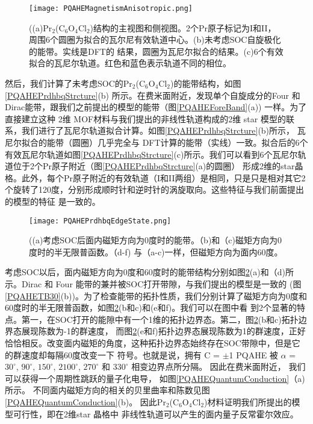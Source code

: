 \begin{figure}[htb]
  \centering
  \texttt{[image: PQAHEMagnetismAnisotropic.png]}
  \caption{((a)Pr$_2$(C$_6$O$_4$Cl$_2$)结构的主视图和侧视图。2个Pr原子标记为I和II，周围6个圆圈为拟合的瓦尔尼有效轨道中心。(b)未考虑SOC自旋极化的能带。实线是DFT的
  结果，圆圈为瓦尼尔拟合的结果。(c)6个有效拟合的瓦尼尔轨道。红色和蓝色表示轨道不同的相位。}
  \label{PQAHEMagnetismAnisotropic}
  \note{}
\end{figure}

然后，我们计算了未考虑SOC的Pr$_2$(C$_6$O$_4$Cl$_2$)的能带结构，如图
\ref{PQAHEPrdhbqStrcture}(b) 所示。在费米面附近，发现单个自旋成分的Four 和 Dirac能带，跟我们之前提出的模型的能带（图\ref{PQAHEForeBand}(a)) 一样。为了直接建立这种
2维 MOF材料与我们提出的非线性轨道构成的2维 star 模型的联系，我们进行了瓦尼尔轨道拟合计算。如图\ref{PQAHEPrdhbqStrcture}(b)所示， 瓦尼尔拟合的能带（圆圈）几乎完全与
DFT计算的能带（实线）一致。拟合后的6个有效瓦尼尔轨道如图\ref{PQAHEPrdhbqStrcture}(c)所示。我们可以看到6个瓦尼尔轨道位于2个Pr原子附近（图\ref{PQAHEPrdhbqStrcture}(a)的圆圈）
形成2维的star晶格。此外，每个Pr原子附近的有效轨道（I和II两组）是相同，只是只是相对其它2个旋转了120度，分别形成顺时针和逆时针的涡旋取向。这些特征与我们前面提出的模型的特征
是一致的。

\begin{figure}[htb]
  \centering
  \texttt{[image: PQAHEPrdhbqEdgeState.png]}
  \caption{((a)考虑SOC后面内磁矩方向为0度时的能带。（b)和（c)磁矩方向为0度时的半无限普函数。（d-f) 与（a-c)一样，但磁矩方向为面内60度。}
  \label{PQAHEPrdhbqEdgeState}
  \note{}
\end{figure}

考虑SOC以后，面内磁矩方向为0度和60度时的能带结构分别如图\ref{PQAHEPrdhbqEdgeState}(a)和（d)所示。Dirac 和 Four 能带的兼并被SOC打开带隙，与我们提出的模型是一致的
(图\ref{PQAHETB30}(b))。为了检查能带的拓扑性质，我们分别计算了磁矩方向为0度和60度时的半无限普函数，如图\ref{PQAHEPrdhbqEdgeState}(b和c)和(e和f)。我们可以在图中看
到2个显著的特点。第一，在SOC打开的能隙中有一个1维的拓扑边界态。第二，图\ref{PQAHEPrdhbqEdgeState}(b和c)拓扑边界态展现陈数为-1的群速度，
而图\ref{PQAHEPrdhbqEdgeState}(e和f)拓扑边界态展现陈数为1的群速度，正好恰恰相反。改变面内磁矩的角度，这种拓扑边界态始终存在SOC带隙中，但是它的群速度却每隔60度改变一下
符号。也就是说，拥有 C = $\pm$1 PQAHE 被 $\alpha$ = $30 ^\circ$, $90 ^\circ$, $150 ^\circ$, $2100 ^\circ$, $270 ^\circ$ 和 $330 ^\circ$ 相变边界点所分隔。
因此在费米面附近， 我们可以获得一个周期性跳跃的量子化电导， 如图\ref{PQAHEQuantumConduction}（a)所示。
不同面内磁矩方向的相关的贝里曲率和陈数见图\ref{PQAHEQuantumConduction}(b)。 因此Pr$_2$(C$_6$O$_4$Cl$_2$)材料证明我们所提出的模型可行性，即在2维star 晶格中
非线性轨道可以产生的面内量子反常霍尔效应。

